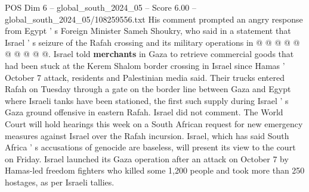 \begin{textsample}{POS Dim 6 – global\_south\_2024\_05 – Score 6.00 – global\_south\_2024\_05/108259556.txt}
His comment prompted an angry response from Egypt ' s Foreign Minister Sameh Shoukry, who said in a statement that Israel ' s seizure of the Rafah crossing and its military operations in @ @ @ @ @ @ @ @ @ @.
Israel told \textbf{merchants} in Gaza to retrieve commercial goods that had been stuck at the Kerem Shalom border crossing in Israel since Hamas ' October 7 attack, residents and Palestinian media said.
Their trucks entered Rafah on Tuesday through a gate on the border line between Gaza and Egypt where Israeli tanks have been stationed, the first such supply during Israel ' s Gaza ground offensive in eastern Rafah.
Israel did not comment.
The World Court will hold hearings this week on a South African request for new emergency measures against Israel over the Rafah incursion.
Israel, which has said South Africa ' s accusations of genocide are baseless, will present its view to the court on Friday.
Israel launched its Gaza operation after an attack on October 7 by Hamas-led freedom fighters who killed some 1,200 people and took more than 250 hostages, as per Israeli tallies.

\end{textsample}

